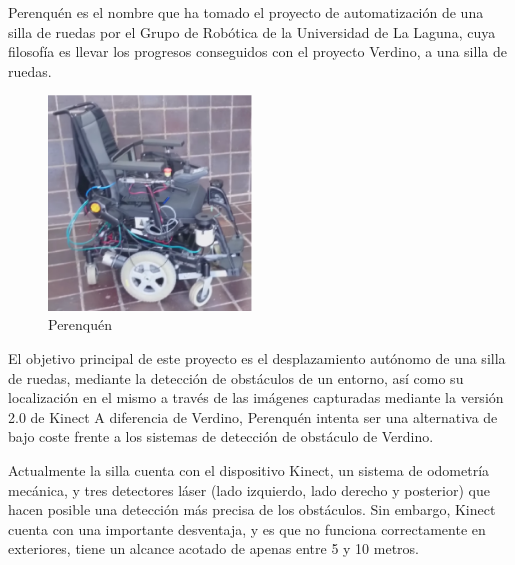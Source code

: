 



Perenquén es el nombre que ha tomado el proyecto de automatización de una silla
de ruedas por el Grupo de Robótica de la Universidad de La Laguna, cuya
filosofía es llevar los progresos conseguidos con el proyecto Verdino, a una
silla de ruedas.

\begin{figure}
  \vspace{-20pt}
  \begin{center}
    \includegraphics[width=0.48\textwidth]{images/cap3/Perenquen.eps}
  \end{center}
  \vspace{-20pt}
  \caption{Perenquén}
  \vspace{-10pt}
  \label{fig:Perenquen}
\end{figure}

El objetivo principal de este proyecto es el desplazamiento autónomo de una
silla de ruedas, mediante la detección de obstáculos de un entorno, así como su
localización en el mismo a través de las imágenes capturadas mediante la versión
2.0 de Kinect A diferencia de Verdino, Perenquén intenta ser una alternativa de
bajo coste frente a los sistemas de detección de obstáculo de Verdino.

Actualmente la silla cuenta con el dispositivo Kinect, un sistema de odometría
mecánica, y tres detectores láser (lado izquierdo, lado derecho y posterior) que
hacen posible una detección más precisa de los obstáculos. Sin embargo, Kinect cuenta con una importante desventaja, y es que no funciona correctamente en exteriores, tiene un alcance acotado de apenas entre 5 y 10 metros. 

